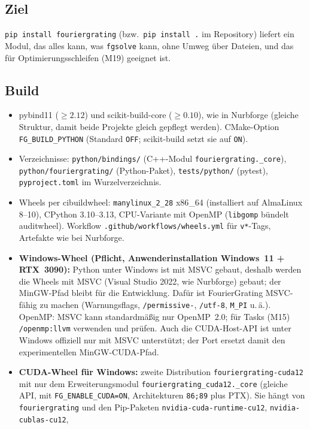 \subsection{Ziel}
\verb|pip install fouriergrating| (bzw.\ \verb|pip install .| im Repository) liefert ein Modul, das alles kann,
was \verb|fgsolve| kann, ohne Umweg über Dateien, und das für Optimierungsschleifen (M19) geeignet ist.

\subsection{Build}
\begin{itemize}[nosep]
  \item pybind11 ($\ge2.12$) und scikit-build-core ($\ge0.10$), wie in Nurbforge (gleiche Struktur,
        damit beide Projekte gleich gepflegt werden). CMake-Option \verb|FG_BUILD_PYTHON| (Standard \verb|OFF|;
        scikit-build setzt sie auf \verb|ON|).
  \item Verzeichnisse: \verb|python/bindings/| (C++-Modul \verb|fouriergrating._core|),
        \verb|python/fouriergrating/| (Python-Paket), \verb|tests/python/| (pytest), \verb|pyproject.toml| im Wurzelverzeichnis.
  \item Wheels per cibuildwheel: \verb|manylinux_2_28| x86\_64 (installiert auf AlmaLinux 8--10), CPython 3.10--3.13,
        CPU-Variante mit OpenMP (\verb|libgomp| bündelt auditwheel). Workflow \verb|.github/workflows/wheels.yml| für
        \verb|v*|-Tags, Artefakte wie bei Nurbforge.
  \item \textbf{Windows-Wheel (Pflicht, Anwenderinstallation Windows~11 + RTX~3090):} Python unter Windows ist mit MSVC
        gebaut, deshalb werden die Wheels mit MSVC (Visual Studio 2022, wie Nurbforge) gebaut; der MinGW-Pfad bleibt für
        die Entwicklung. Dafür ist FourierGrating MSVC-fähig zu machen (Warnungsflags, \verb|/permissive-|, \verb|/utf-8|,
        \verb|M_PI| u.\,ä.). OpenMP: MSVC kann standardmäßig nur OpenMP~2.0; für Tasks (M15) \verb|/openmp:llvm|
        verwenden und prüfen. Auch die CUDA-Host-API ist unter Windows offiziell nur mit MSVC unterstützt; der Port ersetzt
        damit den experimentellen MinGW-CUDA-Pfad.
  \item \textbf{CUDA-Wheel für Windows:} zweite Distribution \verb|fouriergrating-cuda12| mit nur dem Erweiterungsmodul
        \verb|fouriergrating_cuda12._core| (gleiche API, mit \verb|FG_ENABLE_CUDA=ON|, Architekturen \verb|86;89| plus PTX).
        Sie hängt von \verb|fouriergrating| und den Pip-Paketen \verb|nvidia-cuda-runtime-cu12|, \verb|nvidia-cublas-cu12|,

\end{itemize}
